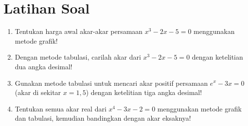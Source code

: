 \section*{Latihan Soal}

\begin{enumerate}
  \item Tentukan harga awal akar-akar persamaan $x^3 - 2x - 5 = 0$ menggunakan metode grafik!
  \item Dengan metode tabulasi, carilah akar dari $x^3 - 2x - 5 = 0$ dengan ketelitian dua angka desimal!
  \item Gunakan metode tabulasi untuk mencari akar positif persamaan $e^x - 3x = 0$ (akar di sekitar $x = 1{,}5$) dengan ketelitian tiga angka desimal!
  \item Tentukan semua akar real dari $x^4 - 3x - 2 = 0$ menggunakan metode grafik dan tabulasi, kemudian bandingkan dengan akar eksaknya!
\end{enumerate}
